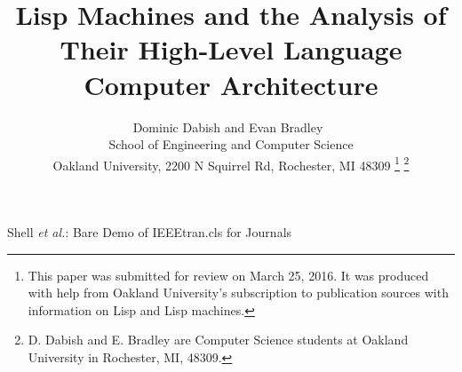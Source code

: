 \documentclass[journal]{IEEEtran}
\begin{document}
%
\title{Lisp Machines and the Analysis of Their High-Level Language Computer Architecture}
%
%
%

\author{
	\IEEEauthorblockN
		{
			Dominic Dabish and Evan Bradley\
		}
	\IEEEauthorblockN
		{
			\\School of Engineering and Computer Science
		}
	\IEEEauthorblockN
		{
			\\Oakland University, 2200 N Squirrel Rd, Rochester, MI 48309
		}
\thanks{
This paper was submitted for review on March 25, 2016. It was produced with help from Oakland University's subscription to publication sources with information on Lisp and Lisp machines.
}%
\thanks{
D. Dabish and E. Bradley are Computer Science students at Oakland University in Rochester, MI, 			48309. 
}%
}

% 
%



%
{Shell \MakeLowercase{\textit{et al.}}: Bare Demo of IEEEtran.cls for Journals}
% 
\end{document}

